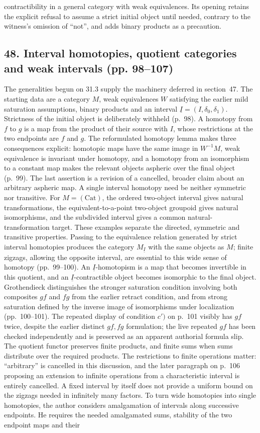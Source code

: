 \documentclass[10pt,oneside]{book}
\begin{document}
contractibility in a general category with weak equivalences. Its opening retains the explicit refusal to assume a strict initial object until needed, contrary to the witness's omission of ``not'', and adds binary products as a precaution.

\subsection*{48. Interval homotopies, quotient categories and weak intervals (pp. 98--107)}
The generalities begun on 31.3 supply the machinery deferred in section~47. The starting data are a category $M$, weak equivalences $W$ satisfying the earlier mild saturation assumptions, binary products and an interval $\underline I=(I,\delta_0,\delta_1)$. Strictness of the initial object is deliberately withheld (p.~98). A homotopy from $f$ to $g$ is a map from the product of their source with $I$, whose restrictions at the two endpoints are $f$ and $g$. The reformulated homotopy lemma makes three consequences explicit: homotopic maps have the same image in $W^{-1}M$, weak equivalence is invariant under homotopy, and a homotopy from an isomorphism to a constant map makes the relevant objects aspheric over the final object (p.~99). The last assertion is a revision of a cancelled, broader claim about an arbitrary aspheric map. A single interval homotopy need be neither symmetric nor transitive. For $M=(\mathrm{Cat})$, the ordered two-object interval gives natural transformations, the equivalent-to-a-point two-object groupoid gives natural isomorphisms, and the subdivided interval gives a common natural-transformation target. These examples separate the directed, symmetric and transitive properties. Passing to the equivalence relation generated by strict interval homotopies produces the category $M_{\underline I}$ with the same objects as $M$; finite zigzags, allowing the opposite interval, are essential to this wide sense of homotopy (pp.~99--100). An $\underline I$-homotopism is a map that becomes invertible in this quotient, and an $\underline I$-contractible object becomes isomorphic to the final object. Grothendieck distinguishes the stronger saturation condition involving both composites $gf$ and $fg$ from the earlier retract condition, and from strong saturation defined by the inverse image of isomorphisms under localization (pp.~100--101). The repeated display of condition $c')$ on p.~101 visibly has $gf$ twice, despite the earlier distinct $gf,fg$ formulation; the live repeated $gf$ has been checked independently and is preserved as an apparent authorial formula slip. The quotient functor preserves finite products, and finite sums when sums distribute over the required products. The restrictions to finite operations matter: ``arbitrary'' is cancelled in this discussion, and the later paragraph on p.~106 proposing an extension to infinite operations from a characteristic interval is entirely cancelled. A fixed interval by itself does not provide a uniform bound on the zigzags needed in infinitely many factors. To turn wide homotopies into single homotopies, the author considers amalgamation of intervals along successive endpoints. He requires the needed amalgamated sums, stability of the two endpoint maps and their 
\end{document}
